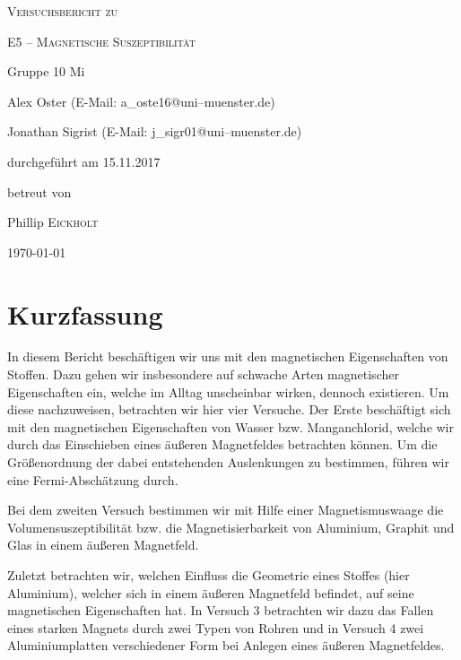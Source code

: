 \documentclass[11pt,a4paper,titlepage, ngerman]{article}
\begin{document}
	\begin{titlepage}
		\centering
		{\scshape\LARGE Versuchsbericht zu \par}
		\vspace{1cm}
		{\scshape\huge E5 -- Magnetische Suszeptibilität\par}
		\vspace{2.5cm}
		{\LARGE Gruppe 10 Mi\par}
		\vspace{0.5cm}
		{\large Alex Oster (E-Mail: a\_oste16@uni--muenster.de) \par}
		{\large Jonathan Sigrist (E-Mail: j\_sigr01@uni--muenster.de) \par}
		\vfill
		durchgeführt am 15.11.2017\par
		betreut von\par
		{\large Phillip \textsc{Eickholt}}		
		\vfill	
		{\large \today\par}
	\end{titlepage}
		
	\tableofcontents
		
	\newpage
	
	\section{Kurzfassung}
		
		In diesem Bericht beschäftigen wir uns mit den magnetischen Eigenschaften von Stoffen.
		Dazu gehen wir insbesondere auf \glqq schwache\grqq{} Arten magnetischer Eigenschaften ein, welche im Alltag unscheinbar wirken, dennoch existieren.
		Um diese nachzuweisen, betrachten wir hier vier Versuche.
		Der Erste beschäftigt sich mit den magnetischen Eigenschaften von Wasser bzw. Manganchlorid, welche wir durch das Einschieben eines äußeren Magnetfeldes betrachten können.
		Um die Größenordnung der dabei entstehenden Auslenkungen zu bestimmen, führen wir eine Fermi-Abschätzung durch.
		
		Bei dem zweiten Versuch bestimmen wir mit Hilfe einer Magnetismuswaage die Volumensuszeptibilität bzw. die Magnetisierbarkeit von Aluminium, Graphit und Glas in einem äußeren Magnetfeld.
		
		Zuletzt betrachten wir, welchen Einfluss die Geometrie eines Stoffes (hier Aluminium), welcher sich in einem äußeren Magnetfeld befindet, auf seine magnetischen Eigenschaften hat.
		In Versuch 3 betrachten wir dazu das Fallen eines starken Magnets durch zwei Typen von Rohren und in Versuch 4 zwei Aluminiumplatten verschiedener Form bei Anlegen eines äußeren Magnetfeldes.		
\end{document}
